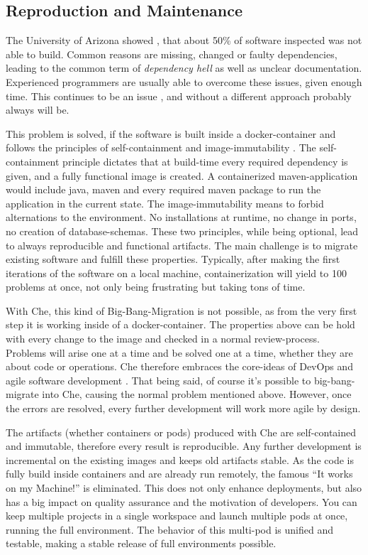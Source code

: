 \documentclass[utf8]{lni}
\begin{document}
\subsection{Reproduction and Maintenance}
The University of Arizona showed \cite{CO16}, that about 50\% of software inspected was not able to build. 
Common reasons are missing, changed or faulty dependencies, leading to the common term of \textit{dependency hell} as well as unclear documentation. 
Experienced programmers are usually able to overcome these issues, given enough time. This continues to be an issue \cite{CL14}, and without a different approach probably always will be. 

This problem is solved, if the software is built inside a docker-container and follows the principles of self-containment and image-immutability \cite{BI17}.
The self-containment principle dictates that  at build-time every required dependency is given, and a fully functional image is created.
A containerized maven-application would include java, maven and every required maven package to run the application in the current state. 
The image-immutability means to forbid alternations to the environment. 
No installations at runtime, no change in ports, no creation of database-schemas.
These two principles, while being optional, lead to always reproducible and functional artifacts.
The main challenge is to migrate existing software and fulfill these properties. 
Typically, after making the first iterations of the software on a local machine, containerization will yield to 100 problems at once, not only being frustrating but taking tons of time. 

With Che, this kind of Big-Bang-Migration is not possible, as from the very first step it is working inside of a docker-container.
The properties above can be hold with every change to the image and checked in a normal review-process. 
Problems will arise one at a time and be solved one at a time, whether they are about code or operations. 
Che therefore embraces the core-ideas of DevOps \cite{HUE12}\cite{JA16} and agile software development \cite{EBE16}.
That being said, of course it's possible to big-bang-migrate into Che, causing the normal problem mentioned above. 
However, once the errors are resolved, every further development will work more agile by design.

The artifacts (whether containers or pods) produced with Che are self-contained and immutable, therefore every result is reproducible. 
Any further development is incremental on the existing images and keeps old artifacts stable. 
As the code is fully build inside containers and are already run remotely, the famous “It works on my Machine!” is eliminated. 
This does not only enhance deployments, but also has a big impact on quality assurance and the motivation of developers. 
You can keep multiple projects in a single workspace and launch multiple pods at once, running the full environment. 
The behavior of this multi-pod is unified and testable, making a stable release of full environments possible. 
\end{document}
